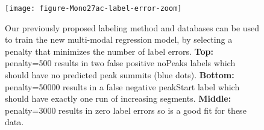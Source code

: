 \documentclass{article}
\begin{document}

\begin{figure}
  \centering
  \texttt{[image: figure-Mono27ac-label-error-zoom]}
  \caption{Our previously proposed labeling method and databases can
    be used to train the new multi-modal regression model, by
    selecting a penalty that minimizes the number of label
    errors. \textbf{Top:} penalty=500 results in two false positive
    noPeaks labels which should have no predicted peak summits (blue
    dots). \textbf{Bottom:} penalty=50000 results in a false negative
    peakStart label which should have exactly one run of increasing
    segments. \textbf{Middle:} penalty=3000 results in zero label
    errors so is a good fit for these data.}
  \label{fig:label-error}
\end{figure}

\end{document}
